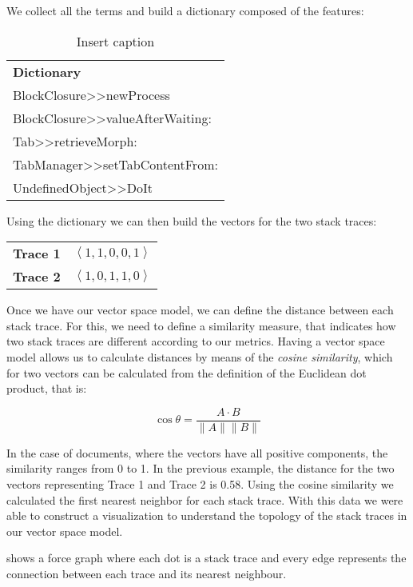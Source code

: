 We collect all the terms and build a dictionary composed of the features:

\begin{table}[h]
{\footnotesize
\begin{centering}
\caption{Insert caption}
\begin{tabular}{l}
\textbf{Dictionary} \\
BlockClosure{>}{>}newProcess \\
BlockClosure{>}{>}valueAfterWaiting: \\
Tab{>}{>}retrieveMorph: \\
TabManager{>}{>}setTabContentFrom: \\
UndefinedObject{>}{>}DoIt
\end{tabular}
\end{centering}}
\end{table}

Using the dictionary we can then build the vectors for the two stack traces:

\begin{center}
\begin{tabular}{p{2cm}r}
\textbf{Trace 1} & $\left<1,1,0,0,1\right>$ \\
\textbf{Trace 2} & $\left<1,0,1,1,0\right>$
\end{tabular}
\end{center}

Once we have our vector space model, we can define the distance between each stack trace.
For this, we need to define a similarity measure, that indicates how two stack traces are different according to our metrics.
Having a vector space model allows us to calculate distances by means of the \emph{cosine similarity}, which for two vectors can be calculated from the definition of the Euclidean dot product, that is:

\begin{displaymath}
    \cos\theta=\frac{A \cdot B}{\|A\|\|B\|}
\end{displaymath}

In the case of documents, where the vectors have all positive components, the similarity ranges from 0 to 1.
In the previous example, the distance for the two vectors representing Trace 1 and Trace 2 is 0.58.
Using the cosine similarity we calculated the first nearest neighbor for each stack trace.
With this data we were able to construct a visualization to understand the topology of the stack traces in our vector space model.

 shows a force graph where each dot is a stack trace and every edge represents the connection between each trace and its nearest neighbour.

